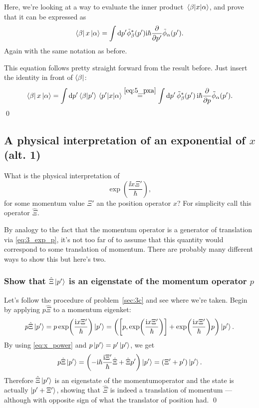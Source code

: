 \documentclass[11pt,letter, swedish, english
]{article}
\begin{document}
\subsubsection{}
Here, we're looking at a way to evaluate the inner product
$\mel{\beta}{x}{\alpha}$, and prove that it can be expressed as
\begin{equation}
\bra{\beta}x\ket{\alpha} 
= \int \rd{p'} \tilde\phi^*_\beta(p')\ii\hbar \pdv{p'} \tilde\phi_\alpha(p').
\end{equation}
Again with the same notation as before.

This equation follows pretty straight forward from the result
before. Just insert the identity in front of $\bra{\beta}$:
\begin{equation}
\bra{\beta}x\ket{\alpha} 
= \int\dd{p'} \braket{\beta}{p'}\mel{p'}{x}{\alpha}
\stackrel{\eqref{eq:5_pxa}}{=} \int\dd{p'} 
\tilde\phi_\beta^*(p') \, \ii\hbar \pdv{p}\tilde\phi_\alpha(p').
\end{equation}
\qed


\subsection{A physical interpretation of an exponential of $x$ (alt. 1)}
What is the physical interpretation of 
\begin{equation}
\exp(\frac{\ii x\Xi'}{\hbar}),
\end{equation}
for some momentum value $\Xi'$ an the position operator $x$? 
For simplicity call this operator $\hat\Xi$. 


By analogy to the fact that the momentum operator is a generator of
translation via \eqref{eq:3_exp_p}, it's not too far of to assume that
this quantity would correspond to some translation of momentum. 
There are probably many different ways to show this but here's two.

\subsubsection{Show that $\hat\Xi\ket{p'}$ is an eigenstate of the
  momentum operator $p$}
Let's follow the procedure of problem~\ref{sec:3c} and see where we're
taken. 
Begin by applying $p\hat\Xi$ to a momentum eigenket:
\begin{equation}
p\hat\Xi\ket{p'}=p\exp(\frac{\ii x\Xi'}{\hbar})\ket{p'} 
= \qty(\comm{p}{\exp(\frac{\ii x\Xi'}{\hbar})}+\exp(\frac{\ii x\Xi'}{\hbar})p)
\ket{p'}.
\end{equation}
By using \eqref{eq:x_power} and $p\ket{p'}=p'\ket{p'}$, we get
\begin{equation}
p\hat\Xi\ket{p'} = 
\qty( -\mathrm{i}\hbar \frac{\mathrm{i}\Xi'}{\hbar} \hat{\Xi} + \hat\Xi p')\ket{p'} 
= \qty(\Xi'+p')\ket{p'}.
\end{equation}
Therefore $\hat\Xi\ket{p'}$ is an eigenstate of the momentumoperator
and the state is actually $\ket{p'+\Xi'}$, showing that $\hat\Xi$
is indeed a translation of momentum --- although with opposite sign of
what the translator of position had. 
\qed
\end{document}
